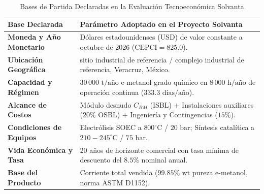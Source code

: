 \documentclass[11pt,letterpaper]{article}
\begin{document}
\begin{table}[htbp]
    \centering
    \small
    \caption{Bases de Partida Declaradas en la Evaluación Tecnoeconómica Solvanta}
    \begin{tabularx}{\textwidth}{l X}
        \toprule
        \rowcolor{tableheader}
        \textbf{\color{white}Base Declarada} & \textbf{\color{white}Parámetro Adoptado en el Proyecto Solvanta} \\
        \midrule
        \textbf{Moneda y Año Monetario} & Dólares estadounidenses (USD) de valor constante a octubre de 2026 ($\text{CEPCI} = 825.0$). \\
        \rowcolor{tablerowgray}
        \textbf{Ubicación Geográfica} & sitio industrial de referencia / complejo industrial de referencia, Veracruz, México. \\
        \textbf{Capacidad y Régimen} & $30\,000\text{ t/año}$ e-metanol grado químico en $8\,000\text{ h/año}$ de operación continua ($333.3\text{ días/año}$). \\
        \rowcolor{tablerowgray}
        \textbf{Alcance de Costos} & Módulo desnudo $C_{BM}$ (ISBL) $+$ Instalaciones auxiliares ($20\%$ OSBL) $+$ Ingeniería y Contingencias ($15\%$). \\
        \textbf{Condiciones de Equipos} & Electrólisis SOEC a $800^\circ\text{C}$ / $20\text{ bar}$; Síntesis catalítica a $210-245^\circ\text{C}$ / $75\text{ bar}$. \\
        \rowcolor{tablerowgray}
        \textbf{Vida Económica y Tasa} & 20 años de horizonte comercial con tasa mínima de descuento del $8.5\%$ nominal anual. \\
        \textbf{Base del Producto} & Corriente total vendida ($99.85\%\text{ wt}$ pureza e-metanol, norma ASTM D1152). \\
        \bottomrule
    \end{tabularx}
\end{table}
\end{document}
